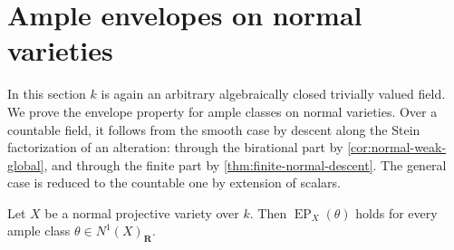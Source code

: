 \documentclass[11pt,a4paper]{article}
\newcommand{\EP}{\operatorname{EP}}
\begin{document}
\section{Ample envelopes on normal varieties}\label{sec:normal-ample}

In this section $k$ is again an arbitrary algebraically closed trivially valued field. We prove the envelope property for ample classes on normal varieties. Over a countable field, it follows from the smooth case by descent along the Stein factorization of an alteration: through the birational part by \cref{cor:normal-weak-global}, and through the finite part by \cref{thm:finite-normal-descent}. The general case is reduced to the countable one by extension of scalars.

\begin{theorem}\label{thm:normal-ample-EP}
Let $X$ be a normal projective variety over $k$. Then $\EP_X(\theta)$ holds for every ample class $\theta\in N^1(X)_{\mathbf R}$.
\end{theorem}
\end{document}
